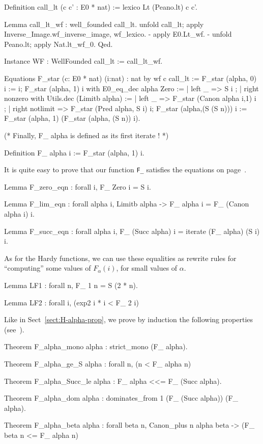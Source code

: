 \documentclass[a4paper]{book}
\begin{document}
\begin{Coqsrc}
Definition call_lt (c c' : E0 * nat) :=
  lexico Lt (Peano.lt) c c'.

Lemma call_lt_wf : well_founded call_lt.
  unfold call_lt; apply Inverse_Image.wf_inverse_image,  wf_lexico.
  -  apply E0.Lt_wf.
  -  unfold Peano.lt; apply Nat.lt_wf_0. 
Qed.

Instance WF : WellFounded call_lt := call_lt_wf.

Equations  F_star (c: E0 * nat) (i:nat) :  nat by wf  c call_lt :=
    F_star (alpha, 0) i := i;
    F_star (alpha, 1) i
      with E0_eq_dec alpha Zero :=
           { | left _ => S i ;
             | right nonzero
                 with Utils.dec (Limitb alpha) :=
                 { | left _ => F_star (Canon alpha i,1) i ;
                   | right notlimit =>
                     F_star (Pred alpha, S i)  i}};
    F_star (alpha,(S (S n))) i :=
               F_star (alpha, 1) (F_star (alpha, (S n)) i).

(* Finally, F_ alpha is defined as its first iterate ! *)

Definition F_  alpha i := F_star (alpha, 1) i.
\end{Coqsrc}

It is quite easy to prove that our function \texttt{F\_} satisfies the equations on page~\pageref{sect:F-equations}.

\begin{Coqsrc}
Lemma F_zero_eqn : forall i, F_ Zero i = S i.

Lemma F_lim_eqn : forall alpha i,  Limitb alpha ->
                               F_ alpha i = F_ (Canon alpha i) i.

Lemma F_succ_eqn : forall alpha i,
    F_ (Succ alpha) i = iterate (F_ alpha) (S i) i.
\end{Coqsrc}

As for the Hardy functions, we can use these equalities as rewrite rules for
``computing'' some values of $F_\alpha(i)$, for small values of $\alpha$.

\begin{Coqsrc}
Lemma LF1 : forall n,  F_ 1 n = S (2 * n).

Lemma LF2 : forall i, (exp2 i * i < F_ 2 i)%
\end{Coqsrc}


Like in Sect~\ref{sect:H-alpha-prop}, we prove by induction the following properties (see~\cite{KS81}). 

\begin{Coqsrc}
Theorem F_alpha_mono alpha : strict_mono (F_ alpha).
 
Theorem F_alpha_ge_S alpha : forall n, (n < F_ alpha n)%

Theorem F_alpha_Succ_le alpha : F_ alpha <<= F_ (Succ alpha).

Theorem F_alpha_dom alpha : dominates_from 1 (F_ (Succ alpha)) (F_ alpha).

Theorem F_alpha_beta alpha : forall beta n, Canon_plus n alpha beta -> 
                                        (F_ beta n <= F_ alpha n)%
\end{Coqsrc}
\end{document}
